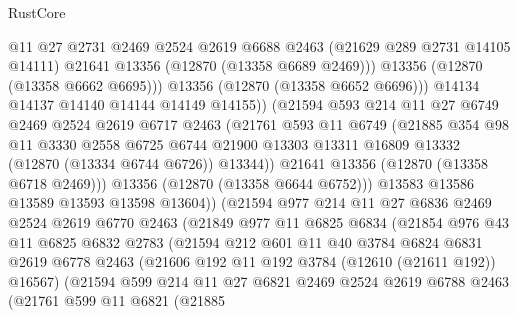 \begin{lexlean}{RustCore}
\begin{coremodule}
                      @11
                      @27
                      @2731
                      @2469
                      @2524
                      @2619
                      @6688
                      @2463
                      (@21629 @289 @2731 @14105 @14111)
                      @21641
                      @13356
                      (@12870 (@13358 @6689 @2469)))
                    @13356
                    (@12870 (@13358 @6662 @6695)))
                  @13356
                  (@12870 (@13358 @6652 @6696)))
                @14134
                @14137
                @14140
                @14144
                @14149
                @14155))
            (@21594
              @593
              @214
              @11
              @27
              @6749
              @2469
              @2524
              @2619
              @6717
              @2463
              (@21761
                @593
                @11
                @6749
                (@21885
                  @354
                  @98
                  @11
                  @3330
                  @2558
                  @6725
                  @6744
                  @21900
                  @13303
                  @13311
                  @16809
                  @13332
                  (@12870 (@13334 @6744 @6726))
                  @13344))
              @21641
              @13356
              (@12870 (@13358 @6718 @2469)))
            @13356
            (@12870 (@13358 @6644 @6752)))
          @13583
          @13586
          @13589
          @13593
          @13598
          @13604))
      (@21594
        @977
        @214
        @11
        @27
        @6836
        @2469
        @2524
        @2619
        @6770
        @2463
        (@21849
          @977
          @11
          @6825
          @6834
          (@21854
            @976
            @43
            @11
            @6825
            @6832
            @2783
            (@21594
              @212
              @601
              @11
              @40
              @3784
              @6824
              @6831
              @2619
              @6778
              @2463
              (@21606 @192 @11 @192 @3784 (@12610 (@21611 @192)) @16567)
              (@21594
                @599
                @214
                @11
                @27
                @6821
                @2469
                @2524
                @2619
                @6788
                @2463
                (@21761
                  @599
                  @11
                  @6821
                  (@21885

\end{coremodule}
\end{lexlean}
